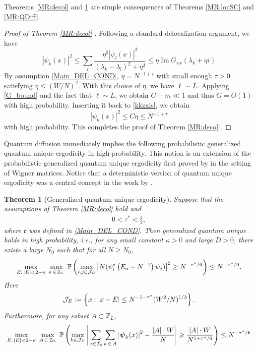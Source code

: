 \documentclass[10pt,reqno]{article}
\DeclareMathOperator{\im}{{\mathrm{Im}}}
\theoremstyle{plain} %
\newtheorem{theorem}{Theorem}[section]
\theoremstyle{remark}
\numberwithin{equation}{section}
\begin{document}
Theorems \ref{MR:decol} and \ref{MR:QUE} are simple consequences of Theorems \ref{MR:locSC} and \ref{MR:QDiff}. 
\begin{proof}[Proof of Theorem \ref{MR:decol} ]
Following  a standard delocalization argument, we have 
\begin{equation} \label{kkzxis}
|\psi_k(x)|^2\le 
\sum_{l}
\frac{\eta^2|\psi_l(x)|^2 }{(\lambda_k-\lambda_l)^2+\eta^2} 
\le \eta \im G_{xx}(\lambda_k+\eta i)
    \end{equation}
By  assumption  \eqref{Main_DEL_COND},   $\eta=N^{-1+\tau}$ with  small enough $\tau>0$ satisfying 
$ \eta\le (W/N)^2$.
With this choice of $\eta$, we have  $\ell\sim L$. Applying  \eqref{G_bound} and the fact that  $\ell\sim L$, we obtain $G-m\ll1$ and thus  $G=O(1)$ with high probability. Inserting  it back to  \eqref{kkzxis},  we obtain  
$$
|\psi_k(x)|^2\le C\eta\le N^{-1+\tau}
$$
with high probability.  This  completes the proof of Theorem \ref{MR:decol}.  
\end{proof}

 Quantum diffusion immediately implies the following probabilistic 
generalized quantum unique ergodicity   in high probability.  This notion is an extension of the probabilistic 
generalized quantum unique ergodicity first proved by \cite{vector_flow} in the setting of Wigner matrices. Notice that a deterministic version of quantum unique ergodicity  was a central concept in the work by \cite{RudSar1994}. 

 
\begin{theorem}[Generalized quantum unique ergodicity]\label{MR:QUE} 
Suppose that the assumptions of Theorem \ref{MR:decol} hold and 
\begin{align}\label{tau} 
0< \tau ^*<  \frac {  \mathfrak c } 2, 
\end{align} 
where $ \mathfrak c$ was defined in \eqref{Main_DEL_COND}.
Then generalized quantum unique holds in high probability, i.e.,  for any small constant $\kappa>0$  and large $D>0$,   there exists  a large  $N_0$ such that for all $N \geqslant N_0$, 
\begin{equation}\label{Meq:QUE}
\max_{E: \,|E|<2-\kappa}\; 
\max_{ a\,\in\, \mathbb Z_L}\;\mathbb{P}\left(\max_{i, j \in {\cal J}_E} 
 \left|N (\psi_i^*\left(E_a-N^{-1}\right) \psi_j)\right|^2 \ge N^{-\tau ^*/6} \right) \le  N^{-\tau ^*/6}.
\end{equation}
Here 
$${\cal J}_E:=\left\{x: |x-E|\le N^{-1-\tau ^*} (W^2/N)^{1/3}\right\}.
$$
Furthermore, for  any  subset $A\subset \mathbb Z_L$,
\begin{equation}\label{Meq:QUE2}
\max_{E: \,|E|<2-\kappa}\; 
\max_{ A\,\subset\, \mathbb Z_L}\;\mathbb{P}\left(\max_{k\in {\cal J}_E} 
\left|\,\sum_{x\in {\cal I}_a}\sum_{a\,\in\, A}\left|\boldsymbol{\psi}_k(x)\right |^2 -\frac{|A|\cdot W}{N}\right| \geqslant \frac{|A|\cdot W}{N^{1+\tau ^*/6}}  \right) \le N^{-\tau ^*/6}
\end{equation}

 

\end{theorem}
\end{document}
